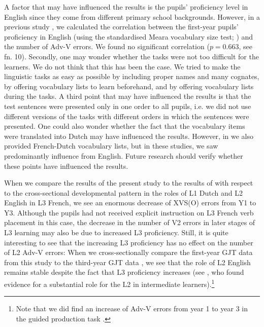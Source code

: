 \documentclass[output=paper]{langsci/langscibook}
\begin{document}
A factor that may have influenced the results is the pupils’ proficiency level in English since they come from different primary school backgrounds. However, in a previous study \citep{StadtEtAl2018Longitudinal}, we calculated the correlation between the first-year pupils’ proficiency in English (using the standardised Meara vocabulary size test; \citealt{Meara2010}) and the number of Adv-V errors. We found no significant correlation ($p = 0.663$, see fn. 10). Secondly, one may wonder whether the tasks were not too difficult for the learners. We do not think that this has been the case. We tried to make the linguistic tasks as easy as possible by including proper names and many cognates, by offering vocabulary lists to learn beforehand, and by offering vocabulary lists during the tasks. A third point that may have influenced the results is that the test sentences were presented only in one order to all pupils, i.e. we did not use different versions of the tasks with different orders in which the sentences were presented. One could also wonder whether the fact that the vocabulary items were translated into Dutch may have influenced the results. However, in \citet{StadtEtAl2016, StadtEtAl2018Exposure} we also provided French-Dutch vocabulary lists, but in these studies, we saw predominantly influence from English. Future research should verify whether these points have influenced the results.

When we compare the results of the present study to the results of \citet{StadtEtAl2016} with respect to the cross-sectional developmental pattern in the roles of L1 Dutch and L2 English in L3 French, we see an enormous decrease of XVS(O) errors from Y1 to Y3. Although the pupils had not received explicit instruction on L3 French verb placement in this case, the decrease in the number of V2 errors in later stages of L3 learning may also be due to increased L3 proficiency. Still, it is quite interesting to see that the increasing L3 proficiency has no effect on the number of L2 Adv-V errors: When we cross-sectionally compare the first-year GJT data from this study to the third-year GJT data \citep{StadtEtAl2016}, we see that the role of L2 English remains stable despite the fact that L3 proficiency increases (see \citealt{Falk2010}, who found evidence for a substantial role for the L2 in intermediate learners).\footnote{Note that we did find an increase of Adv-V errors from year 1 to year 3 in the guided production task \citep{StadtEtAl2018Bilingual}.}
\end{document}
